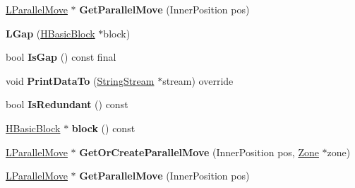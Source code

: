 \begin{DoxyCompactItemize}
\item 
\hyperlink{classv8_1_1internal_1_1_l_parallel_move}{L\+Parallel\+Move} $\ast$ {\bfseries Get\+Parallel\+Move} (Inner\+Position pos)\hypertarget{classv8_1_1internal_1_1_l_gap_a80a7bd7cd4beef3be42928544646c5fb}{}\label{classv8_1_1internal_1_1_l_gap_a80a7bd7cd4beef3be42928544646c5fb}

\item 
{\bfseries L\+Gap} (\hyperlink{classv8_1_1internal_1_1_h_basic_block}{H\+Basic\+Block} $\ast$block)\hypertarget{classv8_1_1internal_1_1_l_gap_a065fcd3080fabb91cccfc541f7cf90f0}{}\label{classv8_1_1internal_1_1_l_gap_a065fcd3080fabb91cccfc541f7cf90f0}

\item 
bool {\bfseries Is\+Gap} () const  final\hypertarget{classv8_1_1internal_1_1_l_gap_ae74844feaf20986b3e1f0c6e6da350f8}{}\label{classv8_1_1internal_1_1_l_gap_ae74844feaf20986b3e1f0c6e6da350f8}

\item 
void {\bfseries Print\+Data\+To} (\hyperlink{classv8_1_1internal_1_1_string_stream}{String\+Stream} $\ast$stream) override\hypertarget{classv8_1_1internal_1_1_l_gap_ad22b85643ee0ccf9a50f8cc0e73abc19}{}\label{classv8_1_1internal_1_1_l_gap_ad22b85643ee0ccf9a50f8cc0e73abc19}

\item 
bool {\bfseries Is\+Redundant} () const \hypertarget{classv8_1_1internal_1_1_l_gap_afd74524d060224489b5e7095e3354e1e}{}\label{classv8_1_1internal_1_1_l_gap_afd74524d060224489b5e7095e3354e1e}

\item 
\hyperlink{classv8_1_1internal_1_1_h_basic_block}{H\+Basic\+Block} $\ast$ {\bfseries block} () const \hypertarget{classv8_1_1internal_1_1_l_gap_a14ee6777d69e95f0c17ce3dcc0c6431e}{}\label{classv8_1_1internal_1_1_l_gap_a14ee6777d69e95f0c17ce3dcc0c6431e}

\item 
\hyperlink{classv8_1_1internal_1_1_l_parallel_move}{L\+Parallel\+Move} $\ast$ {\bfseries Get\+Or\+Create\+Parallel\+Move} (Inner\+Position pos, \hyperlink{classv8_1_1internal_1_1_zone}{Zone} $\ast$zone)\hypertarget{classv8_1_1internal_1_1_l_gap_afa07f91a1bdbab70770e57c45a4c93cd}{}\label{classv8_1_1internal_1_1_l_gap_afa07f91a1bdbab70770e57c45a4c93cd}

\item 
\hyperlink{classv8_1_1internal_1_1_l_parallel_move}{L\+Parallel\+Move} $\ast$ {\bfseries Get\+Parallel\+Move} (Inner\+Position pos)\hypertarget{classv8_1_1internal_1_1_l_gap_a80a7bd7cd4beef3be42928544646c5fb}{}\label{classv8_1_1internal_1_1_l_gap_a80a7bd7cd4beef3be42928544646c5fb}

\end{DoxyCompactItemize}
